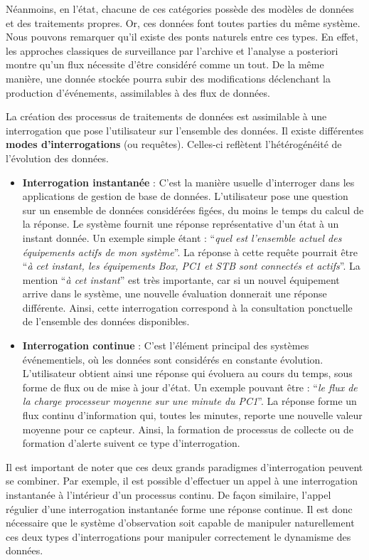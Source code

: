Néanmoins, en l'état, chacune de ces catégories possède des modèles de données et des traitements propres. Or, ces données font toutes parties du même système. Nous pouvons remarquer qu'il existe des ponts naturels entre ces types. En effet, les approches classiques de surveillance par l'archive et l'analyse a posteriori montre qu'un flux nécessite d'être considéré comme un tout. De la même manière, une donnée stockée pourra subir des modifications déclenchant la production d'événements, assimilables à des flux de données.

La création des processus de traitements de données est assimilable à une interrogation que pose l'utilisateur sur l'ensemble des données. Il existe différentes \textbf{modes d'interrogations} (ou requêtes). Celles-ci reflètent l'hétérogénéité de l'évolution des données.
\begin{itemize}
    \item \textbf{Interrogation instantanée} : C'est la manière usuelle d'interroger dans les applications de gestion de base de données. L'utilisateur pose une question sur un ensemble de données considérées figées, du moins le temps du calcul de la réponse. Le système fournit une réponse représentative d'un état à un instant donnée. Un exemple simple étant : \enquote{\it quel est l'ensemble actuel des équipements actifs de mon système}. La réponse à cette requête pourrait être \enquote{\it à cet instant, les équipements Box, PC1 et STB sont connectés et actifs}. La mention \enquote{\it à cet instant} est très importante, car si un nouvel équipement arrive dans le système, une nouvelle évaluation donnerait une réponse différente. Ainsi, cette interrogation correspond à la consultation ponctuelle de l'ensemble des données disponibles.
    \item \textbf{Interrogation continue} : C'est l'élément principal des systèmes événementiels, où les données sont considérés en constante évolution. L'utilisateur obtient ainsi une réponse qui évoluera au cours du temps, sous forme de flux ou de mise à jour d'état. Un exemple pouvant être : \enquote{\it le flux de la charge processeur moyenne sur une minute du PC1}. La réponse forme un flux continu d'information qui, toutes les minutes, reporte une nouvelle valeur moyenne pour ce capteur. Ainsi, la formation de processus de collecte ou de formation d'alerte suivent ce type d'interrogation.
\end{itemize}

Il est important de noter que ces deux grands paradigmes d'interrogation peuvent se combiner. Par exemple, il est possible d'effectuer un appel à une interrogation instantanée à l'intérieur d'un processus continu. De façon similaire, l'appel régulier d'une interrogation instantanée forme une réponse continue. Il est donc nécessaire que le système d'observation soit capable de manipuler naturellement ces deux types d'interrogations pour manipuler correctement le dynamisme des données.

